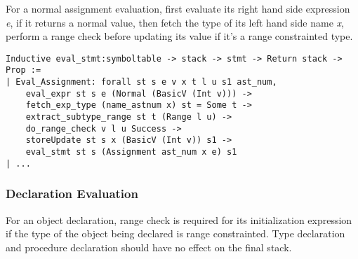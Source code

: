 For a normal assignment evaluation, first evaluate its right hand side
expression \textit{e}, if it returns a normal value, then fetch the type of
its left hand side name \textit{x}, perform a range check before updating
its value if it's a range constrainted type.

\begin{lstlisting}[escapechar=\#, language=coq, basicstyle=\small]
Inductive eval_stmt:symboltable -> stack -> stmt -> Return stack -> Prop :=
| Eval_Assignment: forall st s e v x t l u s1 ast_num,
    eval_expr st s e (Normal (BasicV (Int v))) ->
    fetch_exp_type (name_astnum x) st = Some t ->
    extract_subtype_range st t (Range l u) ->
    do_range_check v l u Success ->
    storeUpdate st s x (BasicV (Int v)) s1 ->
    eval_stmt st s (Assignment ast_num x e) s1
| ...
\end{lstlisting}

\subsubsection{Declaration Evaluation}
For an object declaration, range check is required for its initialization
expression if the type of the object being declared is range constrainted.
Type declaration and procedure declaration should have no effect on the final
stack.











